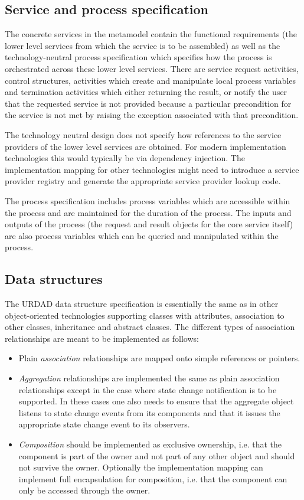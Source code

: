 \subsection{Service and process specification}

The concrete services in the metamodel contain the functional requirements (the lower level services from which the service is to be assembled) as well as the technology-neutral process specification which specifies how the process is orchestrated across these lower level services. There are service request activities, control structures, activities which create and manipulate local process variables and termination activities which either returning the result, or notify the user that the requested service is not provided because a particular precondition for the service is not met by raising the exception associated with that precondition. 

The technology neutral design does not specify how references to the service providers of the lower level services are obtained. For modern implementation technologies this would typically be via dependency injection. The implementation mapping for other technologies might need to introduce a service provider registry and generate the appropriate service provider lookup code.

The process specification includes process variables which are accessible within the process and are maintained for the duration of the process. The inputs and outputs of the process (the request and result objects for the core service itself) are also process variables which can be queried and manipulated within the process.

\subsection{Data structures}

The URDAD data structure specification is essentially the same as in other object-oriented technologies supporting classes with attributes, association to other classes, inheritance and abstract classes. The different types of association relationships are meant to be implemented as follows:
\begin{itemize}
  \item Plain \textit{association} relationships are mapped onto simple references or pointers.
  \item \textit{Aggregation} relationships are implemented the same as plain association relationships except in the case where state change notification is to be supported. In these cases one also needs to ensure that the aggregate object listens to state change events from its components and that it issues the appropriate state change event to its observers.
  \item \textit{Composition} should be implemented as exclusive ownership, i.e. that the component is part of the owner and not part of any other object and should not survive the owner. Optionally the implementation mapping can implement full encapsulation for composition, i.e. that the component can only be accessed through the owner.
\end{itemize}


